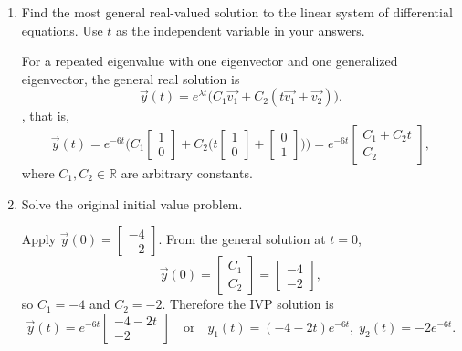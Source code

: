 \begin{enumerate}
\begin{enumerate}[label=(\alph*)]
    \item Find the most general real-valued solution to the linear system of differential equations. Use $t$ as the independent variable in your answers.
    \begin{subanswer}
      For a repeated eigenvalue with one eigenvector and one generalized eigenvector, the general real solution is
      \[
        \overrightarrow{y}(t)=e^{\lambda t}\big(C_1\overrightarrow{v_1}+C_2(t\overrightarrow{v_1}+\overrightarrow{v_2})\big).
      \]
      , that is, 
      \[
        \overrightarrow{y}(t)=e^{-6t}\Big(C_1\left[\begin{array}{r}1 \\ 0\end{array}\right]+C_2\Big(t\left[\begin{array}{r}1 \\ 0\end{array}\right]+\left[\begin{array}{r}0 \\ 1\end{array}\right]\Big)\Big)
        =e^{-6t}\left[\begin{array}{l}C_1+C_2 t \\ C_2\end{array}\right],
      \]
      where $C_1,C_2\in\mathbb{R}$ are arbitrary constants.
    \end{subanswer}

    \item Solve the original initial value problem.
    \begin{subanswer}
      Apply $\overrightarrow{y}(0)=\left[\begin{array}{r}-4 \\ -2\end{array}\right]$. From the general solution at $t=0$,
      \[
        \overrightarrow{y}(0)=\left[\begin{array}{l}C_1 \\ C_2\end{array}\right]=\left[\begin{array}{r}-4 \\ -2\end{array}\right],
      \]
      so $C_1=-4$ and $C_2=-2$. Therefore the IVP solution is
      \[
        \boxed{\displaystyle
          \overrightarrow{y}(t)=e^{-6t}\left[\begin{array}{r}-4-2t \\ -2\end{array}\right]
          \quad\text{or}\quad
          y_1(t)=(-4-2t)e^{-6t},\; y_2(t)=-2e^{-6t}.
        }
      \]
    \end{subanswer}
  \end{enumerate}





\end{enumerate}
